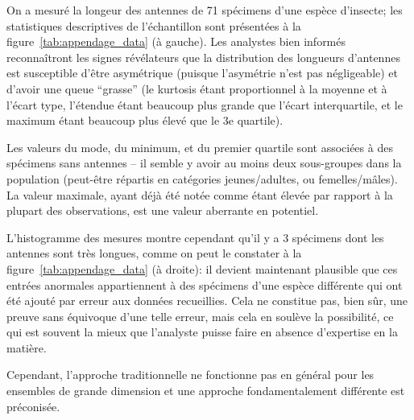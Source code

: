 \begin{Exemple}
On a mesur\'e la longeur des antennes de 71 sp\'ecimens d'une esp\`ece d'insecte; les statistiques descriptives de l'\'echantillon sont pr\'esent\'ees \`a la figure~\ref{tab:appendage_data} (\`a gauche).
\newpage\noindent Les analystes bien inform\'es reconnaîtront les signes révélateurs que la distribution des longueurs d'antennes est susceptible d'être asymétrique (puisque l'asymétrie n'est pas négligeable) et d'avoir une queue ``grasse'' (le kurtosis étant proportionnel à la moyenne et à l'écart type, l'étendue étant beaucoup plus grande que l'\'ecart interquartile, et le maximum étant beaucoup plus \'elev\'e que le 3e quartile). \par Les valeurs du mode, du minimum, et du premier quartile sont associ\'ees à des sp\'ecimens sans antennes -- il semble y avoir au moins deux sous-groupes dans la population (peut-être répartis en catégories jeunes/adultes, ou femelles/m\^ales). La valeur maximale, ayant déjà été not\'ee comme étant \'elev\'ee par rapport \`a la plupart des ob\-ser\-va\-tions, est une valeur aberrante en potentiel. \par L'histogramme des mesures montre cependant qu'il y a 3 sp\'ecimens dont les antennes sont très longues, comme on peut le constater \`a la figure~\ref{tab:appendage_data} (\`a droite): il devient maintenant plausible que ces entrées anormales appartiennent à des sp\'ecimens d'une espèce différente qui ont été ajout\'e par erreur aux donn\'ees recueillies. Cela ne constitue pas, bien sûr, une preuve sans \'equivoque  d'une telle erreur, mais cela en soulève la possibilité, ce qui est souvent la mieux que l'analyste puisse faire en absence d'expertise en la matière.
\end{Exemple}
\noindent Cependant, l'approche traditionnelle ne fonctionne pas en g\'en\'eral pour les ensembles de grande dimension et une approche fondamentalement différente est préconisée.\newpage  
